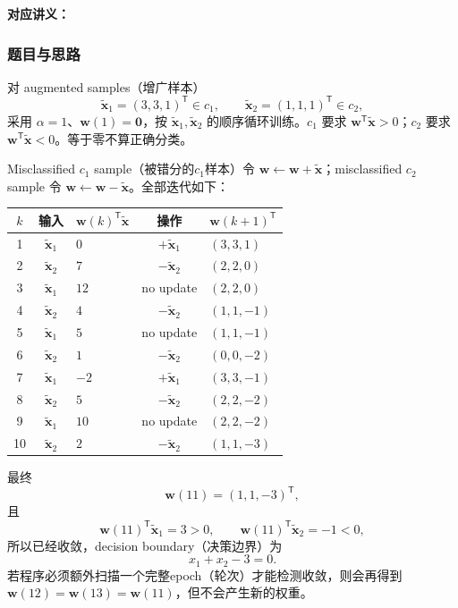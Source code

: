 \textbf{对应讲义：}

\subsubsection*{题目与思路}

对 augmented samples（增广样本）
\[
  \tilde{\bm x}_1=(3,3,1)^{\mathsf T}\in c_1,
  \qquad
  \tilde{\bm x}_2=(1,1,1)^{\mathsf T}\in c_2,
\]
采用 $\alpha=1$、$\bm w(1)=\bm0$，按 $\tilde{\bm x}_1,\tilde{\bm x}_2$ 的顺序循环训练。$c_1$ 要求 $\bm w^{\mathsf T}\tilde{\bm x}>0$；$c_2$ 要求 $\bm w^{\mathsf T}\tilde{\bm x}<0$。等于零不算正确分类。

\begin{checkedsolution}
Misclassified $c_1$ sample（被错分的$c_1$样本）令 $\bm w\leftarrow\bm w+\tilde{\bm x}$；misclassified $c_2$ sample 令 $\bm w\leftarrow\bm w-\tilde{\bm x}$。全部迭代如下：

\begin{center}
\small
\begin{tabular}{@{}cclcl@{}}
  \toprule
  $k$ & 输入 & $\bm w(k)^{\mathsf T}\tilde{\bm x}$ & 操作 & $\bm w(k+1)^{\mathsf T}$ \\
  \midrule
  1  & $\tilde{\bm x}_1$ & $0$  & $+\tilde{\bm x}_1$ & $(3,3,1)$ \\
  2  & $\tilde{\bm x}_2$ & $7$  & $-\tilde{\bm x}_2$ & $(2,2,0)$ \\
  3  & $\tilde{\bm x}_1$ & $12$ & no update & $(2,2,0)$ \\
  4  & $\tilde{\bm x}_2$ & $4$  & $-\tilde{\bm x}_2$ & $(1,1,-1)$ \\
  5  & $\tilde{\bm x}_1$ & $5$  & no update & $(1,1,-1)$ \\
  6  & $\tilde{\bm x}_2$ & $1$  & $-\tilde{\bm x}_2$ & $(0,0,-2)$ \\
  7  & $\tilde{\bm x}_1$ & $-2$ & $+\tilde{\bm x}_1$ & $(3,3,-1)$ \\
  8  & $\tilde{\bm x}_2$ & $5$  & $-\tilde{\bm x}_2$ & $(2,2,-2)$ \\
  9  & $\tilde{\bm x}_1$ & $10$ & no update & $(2,2,-2)$ \\
  10 & $\tilde{\bm x}_2$ & $2$  & $-\tilde{\bm x}_2$ & $(1,1,-3)$ \\
  \bottomrule
\end{tabular}
\end{center}

最终
\[
  \bm w(11)=\boxed{(1,1,-3)^{\mathsf T}},
\]
且
\[
  \bm w(11)^{\mathsf T}\tilde{\bm x}_1=3>0,
  \qquad
  \bm w(11)^{\mathsf T}\tilde{\bm x}_2=-1<0,
\]
所以已经收敛，decision boundary（决策边界）为
\[
  \boxed{x_1+x_2-3=0}.
\]
若程序必须额外扫描一个完整epoch（轮次）才能检测收敛，则会再得到 $\bm w(12)=\bm w(13)=\bm w(11)$，但不会产生新的权重。
\end{checkedsolution}


